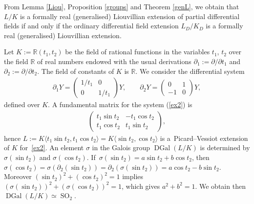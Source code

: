 \documentclass[pdftex]{sigma}%
\numberwithin{equation}{section}
\newcommand{\R}{\mathbb{R}}
\def \DGal{\operatorname{DGal}}
\def \SO{\operatorname{SO}}
\begin{document}
\begin{Remark}
From Lemma \ref{Liou}, Proposition \ref{groups} and Theorem \ref{genL}, we obtain that $L/K$ is a formally real (generalised) Liouvillian extension of partial differential fields if and only if the ordinary differential field extension $L_D/K_D$ is a formally real (generalised) Liouvillian extension.
\end{Remark}

\begin{Example} Let $K:=\R(t_1,t_2)$ be the field of rational functions in the variables $t_1$, $t_2$ over the field $\R$ of real numbers endowed with the usual derivations $\partial_1:= \partial /\partial t_1$ and $\partial_2:= \partial /\partial t_2$. The field of constants of $K$ is $\R$. We consider the differential system
\begin{gather}\label{ex2}
\partial_1 Y= \begin{pmatrix} 1/t_1 & 0 \\ 0 & 1/t_1 \end{pmatrix} Y,\qquad
\partial_2 Y= \begin{pmatrix} 0&1 \\ -1 &0 \end{pmatrix} Y,
\end{gather}
defined over $K$. A fundamental matrix for the system (\ref{ex2}) is
\begin{gather*}
\begin{pmatrix} t_1 \sin t_2 & -t_1 \cos t_2 \\ t_1 \cos t_2 & t_1 \sin t_2 \end{pmatrix}\!,
\end{gather*}
hence $L:=K\langle t_1 \sin t_2,t_1 \cos t_2 \rangle=K\langle \sin t_2, \cos t_2 \rangle$ is a~Picard--Vessiot extension of $K$ for~\eqref{ex2}.
An element $\sigma$ in the Galois group $\DGal(L/K)$ is determined by $\sigma(\sin t_2)$ and $\sigma(\cos t_2)$. If~$\sigma(\sin t_2)\allowbreak=a\sin t_2 +b \cos t_2$, then $\sigma(\cos t_2)=\sigma(\partial_2(\sin t_2))=\partial_2(\sigma(\sin t_2))=a\cos t_2 - b \sin t_2$. Moreover $(\sin t_2)^2+ (\cos t_2)^2=1$ implies $(\sigma(\sin t_2))^2+ (\sigma(\cos t_2))^2=1$, which gives $a^2+b^2=1$. We obtain then $\DGal(L/K) \simeq \SO_2$.


\end{Example}
\end{document}
